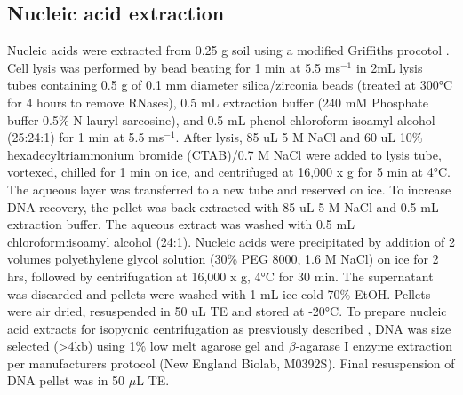 \documentclass{article}
\begin{document}
\subsection{Nucleic acid extraction}
Nucleic acids were extracted from 0.25 g soil using a modified Griffiths
procotol \citep{Griffiths_2000}. Cell lysis was performed by bead beating for
1 min at 5.5 ms$^{-1}$ in 2mL lysis tubes containing 0.5 g of 0.1
mm diameter silica/zirconia beads (treated at 300°C for 4 hours to remove
RNases), 0.5 mL extraction buffer (240 mM Phosphate buffer 0.5\% N-lauryl
sarcosine), and 0.5 mL phenol-chloroform-isoamyl alcohol (25:24:1) for 1 min at
5.5 ms$^{-1}$. After lysis, 85 uL 5 M NaCl and 60 uL 10\%
hexadecyltriammonium bromide (CTAB)/0.7 M NaCl were added to lysis tube,
vortexed, chilled for 1 min on ice, and centrifuged at 16,000 x g for 5 min at
4°C. The aqueous layer was transferred to a new tube and reserved on ice. To
increase DNA recovery, the pellet was back extracted with 85 uL 5 M NaCl and
0.5 mL extraction buffer. The aqueous extract was washed with 0.5 mL
chloroform:isoamyl alcohol (24:1). Nucleic acids were precipitated by addition
of 2 volumes polyethylene glycol solution (30\% PEG 8000, 1.6 M NaCl) on ice
for 2 hrs, followed by centrifugation at 16,000 x g, 4°C for 30 min. The
supernatant was discarded and pellets were washed with 1 mL ice cold 70\% EtOH.
Pellets were air dried, resuspended in 50 uL TE and stored at -20°C. To prepare
nucleic acid extracts for isopycnic centrifugation as presviously described
\citep{Buckley_2007}, DNA was size selected (\textgreater 4kb) using 1\% low
melt agarose gel and $\beta$-agarase I enzyme extraction per manufacturers
protocol (New England Biolab, M0392S).  Final resuspension of DNA pellet was in
50 $\mu$L TE.   
\end{document}
